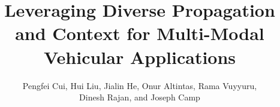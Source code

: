 \documentclass[10pt,conference]{IEEEtran}
\begin{document}
\title{Leveraging Diverse Propagation and Context for Multi-Modal Vehicular Applications}
\author{Pengfei Cui, Hui Liu, Jialin He, Onur Altintas, Rama Vuyyuru, \\
Dinesh Rajan, and Joseph Camp\\ 
}





\maketitle





%





%






\end{document}
